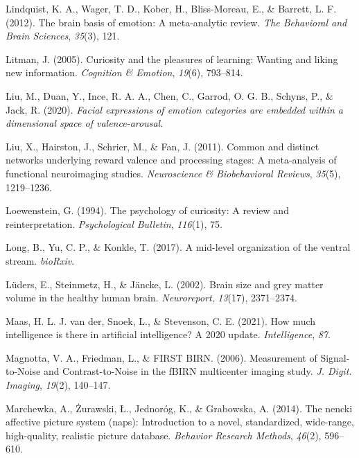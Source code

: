 \documentclass[11pt,american,a4paper,oneside,]{memoir} %
\begin{document}
\leavevmode\hypertarget{ref-lindquist2012brain}{}%
Lindquist, K. A., Wager, T. D., Kober, H., Bliss-Moreau, E., \& Barrett, L. F. (2012). The brain basis of emotion: A meta-analytic review. \emph{The Behavioral and Brain Sciences}, \emph{35}(3), 121.

\leavevmode\hypertarget{ref-litman2005curiosity}{}%
Litman, J. (2005). Curiosity and the pleasures of learning: Wanting and liking new information. \emph{Cognition \& Emotion}, \emph{19}(6), 793--814.

\leavevmode\hypertarget{ref-Liu2020-vo}{}%
Liu, M., Duan, Y., Ince, R. A. A., Chen, C., Garrod, O. G. B., Schyns, P., \& Jack, R. (2020). \emph{Facial expressions of emotion categories are embedded within a dimensional space of valence-arousal}.

\leavevmode\hypertarget{ref-liu2011common}{}%
Liu, X., Hairston, J., Schrier, M., \& Fan, J. (2011). Common and distinct networks underlying reward valence and processing stages: A meta-analysis of functional neuroimaging studies. \emph{Neuroscience \& Biobehavioral Reviews}, \emph{35}(5), 1219--1236.

\leavevmode\hypertarget{ref-loewenstein1994psychology}{}%
Loewenstein, G. (1994). The psychology of curiosity: A review and reinterpretation. \emph{Psychological Bulletin}, \emph{116}(1), 75.

\leavevmode\hypertarget{ref-Long2017-fb}{}%
Long, B., Yu, C. P., \& Konkle, T. (2017). A mid-level organization of the ventral stream. \emph{bioRxiv}.

\leavevmode\hypertarget{ref-Luders2002-ms}{}%
Lüders, E., Steinmetz, H., \& Jäncke, L. (2002). Brain size and grey matter volume in the healthy human brain. \emph{Neuroreport}, \emph{13}(17), 2371--2374.

\leavevmode\hypertarget{ref-Van_der_Maas2021-rx}{}%
Maas, H. L. J. van der, Snoek, L., \& Stevenson, C. E. (2021). How much intelligence is there in artificial intelligence? A 2020 update. \emph{Intelligence}, \emph{87}.

\leavevmode\hypertarget{ref-Magnotta2006-zs}{}%
Magnotta, V. A., Friedman, L., \& FIRST BIRN. (2006). Measurement of Signal-to-Noise and Contrast-to-Noise in the fBIRN multicenter imaging study. \emph{J. Digit. Imaging}, \emph{19}(2), 140--147.

\leavevmode\hypertarget{ref-marchewka2014nencki}{}%
Marchewka, A., Żurawski, Ł., Jednoróg, K., \& Grabowska, A. (2014). The nencki affective picture system (naps): Introduction to a novel, standardized, wide-range, high-quality, realistic picture database. \emph{Behavior Research Methods}, \emph{46}(2), 596--610.
\end{document}
